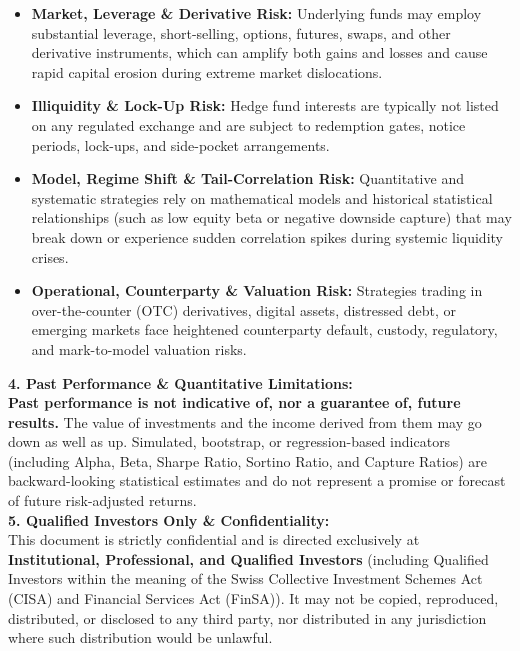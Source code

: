 \documentclass[10pt,a4paper]{article}
\begin{document}
\begin{tcolorbox}
{\begin{itemize}[leftmargin=1.3em, itemsep=1pt, topsep=1pt]
    \item \textbf{Market, Leverage \& Derivative Risk:} Underlying funds may employ substantial leverage, short-selling, options, futures, swaps, and other derivative instruments, which can amplify both gains and losses and cause rapid capital erosion during extreme market dislocations.
    \item \textbf{Illiquidity \& Lock-Up Risk:} Hedge fund interests are typically not listed on any regulated exchange and are subject to redemption gates, notice periods, lock-ups, and side-pocket arrangements.
    \item \textbf{Model, Regime Shift \& Tail-Correlation Risk:} Quantitative and systematic strategies rely on mathematical models and historical statistical relationships (such as low equity beta or negative downside capture) that may break down or experience sudden correlation spikes during systemic liquidity crises.
    \item \textbf{Operational, Counterparty \& Valuation Risk:} Strategies trading in over-the-counter (OTC) derivatives, digital assets, distressed debt, or emerging markets face heightened counterparty default, custody, regulatory, and mark-to-model valuation risks.
\end{itemize}
\vspace{3pt}
\textbf{4. Past Performance \& Quantitative Limitations:}\\[1.5pt]
\textbf{Past performance is not indicative of, nor a guarantee of, future results.} The value of investments and the income derived from them may go down as well as up. Simulated, bootstrap, or regression-based indicators (including Alpha, Beta, Sharpe Ratio, Sortino Ratio, and Capture Ratios) are backward-looking statistical estimates and do not represent a promise or forecast of future risk-adjusted returns.\\[5pt]
\textbf{5. Qualified Investors Only \& Confidentiality:}\\[1.5pt]
This document is strictly confidential and is directed exclusively at \textbf{Institutional, Professional, and Qualified Investors} (including Qualified Investors within the meaning of the Swiss Collective Investment Schemes Act (CISA) and Financial Services Act (FinSA)). It may not be copied, reproduced, distributed, or disclosed to any third party, nor distributed in any jurisdiction where such distribution would be unlawful.
}
\end{tcolorbox}

\vfill
\end{document}

